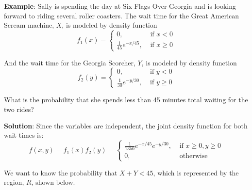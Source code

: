 \textbf{Example}: Sally is spending the day at Six Flags Over Georgia and is 
looking forward to riding several roller coasters. The wait time for the Great 
American Scream machine, $X$, is modeled by density 
function
$$f_1(x) = 
\begin{cases}
0,&\text{ if } x < 0\\
\frac{1}{45}e^{-x/45},&\text{ if } x \geq 0
\end{cases}$$

And the wait time for the Georgia Scorcher, $Y$, is modeled by density function
$$f_2(y) = 
\begin{cases}
0,&\text{ if } y < 0\\
\frac{1}{30}e^{-y/30},&\text{ if } y \geq 0
\end{cases}$$

What is the probability that she spends less than 45 minutes total waiting for 
the two rides?

\textbf{Solution}: Since the variables are independent, the joint density 
function for both wait times is:
$$f(x, y) = f_1(x) f_2(y) = 
\begin{cases}
    \frac{1}{1350}e^{-x/45}e^{-y/30},& \text{ if } x \geq 0, y \geq 0\\
    0,&\text{ otherwise}
\end{cases}$$

We want to know the probability that $X + Y < 45$, which is represented by the 
region, $R$, shown below.

\begin{center}
\end{center}

